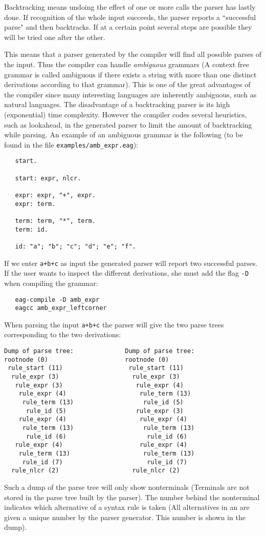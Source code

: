 Backtracking means undoing the effect of one or more calls the
parser has lastly done. If recognition of the whole input 
succeeds, the parser reports a ``successful parse" and then
backtracks. If at a certain point several steps are
possible they will be tried one after the other.

This means that a parser generated by the compiler will find all possible
parses of the input. Thus the compiler can handle {\em ambiguous}
grammars (A context free grammar is called ambiguous if there
exists a string with more than one distinct derivations according to that
grammar). This is one of the great advantages of the \EAG compiler
since many interesting languages are inherently ambiguous, such as
natural languages. The disadvantage of a backtracking parser is
its high (exponential) time complexity.
However the \EAG compiler codes several heuristics, such as lookahead,
in the generated parser to limit the amount of backtracking while parsing.
An example of an ambiguous grammar is the following (to
be found in the file {\tt examples/amb\_expr.eag}):
\begin{verbatim}
   start.

   start: expr, nlcr.

   expr: expr, "+", expr.
   expr: term.

   term: term, "*", term.
   term: id.

   id: "a"; "b"; "c"; "d"; "e"; "f".
\end{verbatim}
If we enter {\tt a+b+c} as input the generated parser will report
two successful parses. If the user wants to inspect the different
derivations, she must add the flag {\tt -D} when compiling the
grammar:
\begin{verbatim}
   eag-compile -D amb_expr
   eagcc amb_expr_leftcorner
\end{verbatim}
When parsing the input {\tt a+b+c} the parser will give the two
parse trees corresponding to the two derivations:
\begin{verbatim}
Dump of parse tree:              Dump of parse tree:
rootnode (0)                     rootnode (0)
 rule_start (11)                  rule_start (11)
  rule_expr (3)                    rule_expr (3)
   rule_expr (3)                    rule_expr (4)
    rule_expr (4)                    rule_term (13)
     rule_term (13)                   rule_id (5)
      rule_id (5)                   rule_expr (3)
    rule_expr (4)                    rule_expr (4)
     rule_term (13)                   rule_term (13)
      rule_id (6)                      rule_id (6)
   rule_expr (4)                     rule_expr (4)
    rule_term (13)                    rule_term (13)
     rule_id (7)                       rule_id (7)
  rule_nlcr (2)                    rule_nlcr (2)
\end{verbatim}
Such a dump of the parse tree will only show nonterminals (Terminals
are not stored in the parse tree built by the parser). The number
behind the nonterminal indicates which alternative
of a syntax rule is taken (All alternatives in an \EAG are given a unique
number by the parser generator. This number is shown in the dump).

